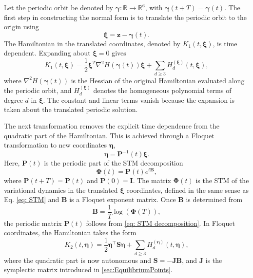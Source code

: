 Let the periodic orbit be denoted by $\boldsymbol{\gamma}:\mathbb{R}\rightarrow\mathbb{R}^6$, with $\boldsymbol{\gamma}(t+T)=\boldsymbol{\gamma}(t)$. 
The first step in constructing the normal form is to translate the periodic orbit to the origin using
\begin{equation}
    \boldsymbol{\xi}=\boldsymbol{z}-\boldsymbol{\gamma}(t).
\end{equation}
The Hamiltonian in the translated coordinates, denoted by $K_1(t,\boldsymbol{\xi})$, is time dependent. 
Expanding about $\boldsymbol{\xi}=0$ gives
\begin{equation}
K_1(t,\boldsymbol{\xi})
=
\frac{1}{2}\boldsymbol{\xi}^{T}
\nabla^2 H(\boldsymbol{\gamma}(t))
\boldsymbol{\xi}
+
\sum_{d \geq 3} H_d^{(\boldsymbol{\xi})}(t,\boldsymbol{\xi}),
\end{equation}
where $\nabla^2 H(\boldsymbol{\gamma}(t))$ is the Hessian of the original Hamiltonian evaluated along the periodic orbit, and $H_d^{(\boldsymbol{\xi})}$ denotes the homogeneous polynomial terms of degree $d$ in $\boldsymbol{\xi}$. 
The constant and linear terms vanish because the expansion is taken about the translated periodic solution.

The next transformation removes the explicit time dependence from the quadratic part of the Hamiltonian. 
This is achieved through a Floquet transformation to new coordinates $\boldsymbol{\eta}$,
\begin{equation}
    \boldsymbol{\eta}=\boldsymbol{P}^{-1}(t)\boldsymbol{\xi}.
\end{equation}
Here, $\boldsymbol{P}(t)$ is the periodic part of the STM decomposition
\begin{equation}
\label{eq: STM decomposition}
\boldsymbol{\Phi}(t) = \boldsymbol{P}(t)e^{t\boldsymbol{B}},
\end{equation}
where $\boldsymbol{P}(t+T)=\boldsymbol{P}(t)$ and $\boldsymbol{P}(0)=\boldsymbol{I}$. 
The matrix $\boldsymbol{\Phi}(t)$ is the STM of the variational dynamics in the translated $\boldsymbol{\xi}$ coordinates, defined in the same sense as Eq. \eqref{eq: STM} and $\boldsymbol{B}$ is a Floquet exponent matrix. 
Once $\boldsymbol{B}$ is determined from
\begin{equation}
    \boldsymbol{B} = \frac{1}{T}\log\!\left(\boldsymbol{\Phi}(T)\right),
\end{equation}
the periodic matrix $\boldsymbol{P}(t)$ follows from \cref{eq: STM decomposition}. 
In Floquet coordinates, the Hamiltonian takes the form
\begin{equation}
    K_2(t,\boldsymbol{\eta}) 
    = \frac{1}{2}\boldsymbol{\eta}^{\top} \boldsymbol{S} \boldsymbol{\eta} 
    + \sum_{d \ge 3} H_d^{(\boldsymbol{\eta})}(t,\boldsymbol{\eta}),
\end{equation}
where the quadratic part is now autonomous and $\boldsymbol{S}=-\boldsymbol{J}\boldsymbol{B}$, and $\boldsymbol{J}$ is the symplectic matrix introduced in \cref{sec:EquilibriumPoints}.

